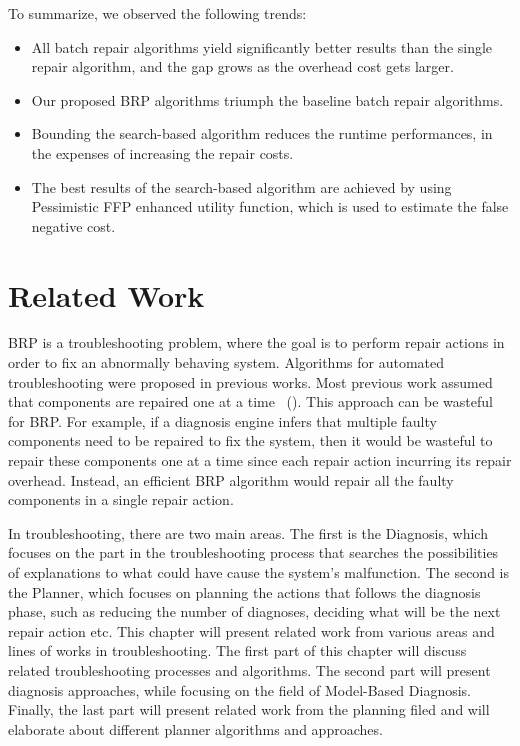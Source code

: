 \documentclass[review]{elsarticle}
\newcommand\meir[1]{\textcolor{red}{meir: #1}}
\begin{document}
To summarize, we observed the following trends:
\begin{itemize}
\item All batch repair algorithms yield significantly better results than the single repair algorithm, and the gap grows as the overhead cost gets larger.  
\item Our proposed BRP algorithms triumph the baseline batch repair algorithms.
\item Bounding the search-based algorithm reduces the runtime performances, in the expenses of increasing the repair costs. 
\item The best results of the search-based algorithm are achieved by using Pessimistic FFP enhanced utility function, which is used to estimate the false negative cost.
\end{itemize}

\section{Related Work}
\label{sec:relatedWork}	
BRP is a troubleshooting problem, where the goal is to perform repair actions in order to fix an abnormally behaving system. Algorithms for automated troubleshooting were proposed in previous works. Most previous work assumed that components are repaired one at a time ~(\cite{heckerman1995decision,friedrich1992choosing,Nyberg12,Torta14}). This approach can be wasteful for BRP. For example, if a diagnosis engine infers that multiple faulty components need to be repaired to fix the system, then it would be wasteful to repair these components one at a time since each repair action incurring its repair overhead. Instead, an efficient BRP algorithm would repair all the faulty components in a single repair action. 


In troubleshooting, there are two main areas. The first is the Diagnosis, which focuses on the part in the troubleshooting process that searches the possibilities of explanations to what could have cause the system's malfunction. The second is the Planner, which focuses on planning the actions that follows the diagnosis phase, such as reducing the number of diagnoses, deciding what will be the next repair action etc. This chapter will present related work from various areas and lines of works in troubleshooting. The first part of this chapter will discuss related troubleshooting processes and algorithms. The second part will present diagnosis approaches, while focusing on the field of Model-Based Diagnosis. Finally, the last part will present related work from the planning filed and will elaborate about different planner algorithms and approaches. 
\end{document}
